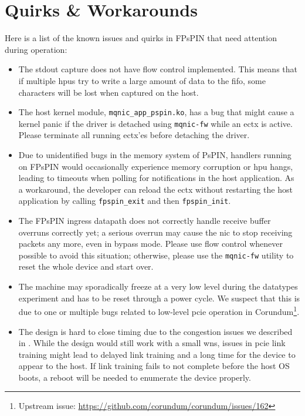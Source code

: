 \section{Quirks \& Workarounds} \label{sec:quirks}

Here is a list of the known issues and quirks in FPsPIN that need attention during operation:

\begin{itemize}
    \item The stdout capture does not have flow control implemented.  This means that if multiple \ac{hpu}s try to write a large amount of data to the \ac{fifo}, some characters will be lost when captured on the host.
    \item The host kernel module, \texttt{mqnic\_app\_pspin.ko}, has a bug that might cause a kernel panic if the driver is detached using \texttt{mqnic-fw} while an \ac{ectx} is active.  Please terminate all running \ac{ectx}'es before detaching the driver.
    \item Due to unidentified bugs in the memory system of PsPIN, handlers running on FPsPIN would occasionally experience memory corruption or \ac{hpu} hangs, leading to timeouts when polling for notifications in the host application.  As a workaround, the developer can reload the \ac{ectx} without restarting the host application by calling \texttt{fpspin\_exit} and then \texttt{fpspin\_init}.
    \item The FPsPIN ingress datapath does not correctly handle receive buffer overruns correctly yet; a serious overrun may cause the \ac{nic} to stop receiving packets any more, even in bypass mode.  Please use flow control whenever possible to avoid this situation; otherwise, please use the \texttt{mqnic-fw} utility to reset the whole device and start over.
    \item The machine may sporadically freeze at a very low level during the datatypes experiment and has to be reset through a power cycle.  We suspect that this is due to one or multiple bugs related to low-level \ac{pcie} operation in Corundum\footnote{Upstream issue: \url{https://github.com/corundum/corundum/issues/162}}.
    \item The design is hard to close timing due to the congestion issues we described in .  While the design would still work with a small \ac{wns}, issues in \ac{pcie} link training might lead to delayed link training and a long time for the device to appear to the host.  If link training fails to not complete before the host OS boots, a reboot will be needed to enumerate the device properly.
\end{itemize}
